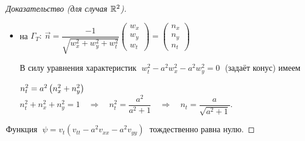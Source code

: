 \documentclass[../main.tex]{subfiles}
\begin{document}
\begin{proof}[Доказательство (для случая $\mathbb{R}^2$)]
\begin{itemize}
	\item на $\Gamma_T:\ \vec{n}=\dfrac{-1}{\sqrt{w_x^2+w^2_y+w^2_t}}
  \begin{pmatrix} w_x \\ w_y \\ w_t \end{pmatrix} =
  \begin{pmatrix} n_x \\ n_y \\ n_t \end{pmatrix}
  $
  \vspace{0.5em}

  В силу уравнения характеристик $\; w_t^2 - a^2w^2_x - a^2w^2_y = 0 \;$ (задаёт конус) имеем

  $n^2_t = a^2 \left(n^2_x + n^2_y\right)$\\
  $n^2_t + n^2_x + n^2_y = 1 \quad \Rightarrow \quad n^2_t = \dfrac{a^2}{a^2 +1} \quad \Rightarrow\quad n_t = \dfrac{a}{\sqrt{a^2+1}}.$
\end{itemize}


Функция 
$ \; \psi = v_t(v_{tt}- a^2v_{xx} - a^2v_{yy})\; $ тождественно равна нулю.


\end{proof}
\end{document}
